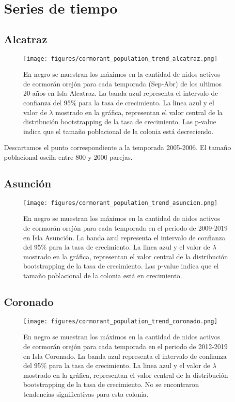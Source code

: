 \documentclass{article} %
\begin{document}
\section*{Series de tiempo}

\subsection*{Alcatraz}

\begin{figure}[H]
\hspace{-2cm}
    \texttt{[image: figures/cormorant\_population\_trend\_alcatraz.png]}
\caption{En negro se muestran los máximos en la cantidad de nidos activos de cormorán orejón para cada temporada (Sep-Abr) de los ultimos 20 años en Isla Alcatraz. La banda azul representa el intervalo de confianza del 95\% para la tasa de crecimiento. La linea azul y el valor de $\lambda$ mostrado en la gráfica, representan el valor central de la distribución bootstrapping de la tasa de crecimiento. Las p-value indica que el tamaño poblacional de la colonia está decreciendo.}
\end{figure}

Descartamos el punto correspondiente a la temporada 2005-2006. El tamaño poblacional oscila entre 800 y 2000 parejas. 

\subsection*{Asunción}

\begin{figure}[H]
\hspace{-2cm}
    \texttt{[image: figures/cormorant\_population\_trend\_asuncion.png]}
\caption{En negro se muestran los máximos en la cantidad de nidos activos de cormorán orejón para cada temporada en el periodo de 2009-2019 en Isla Asunción. La banda azul representa el intervalo de confianza del 95\% para la tasa de crecimiento. La linea azul y el valor de $\lambda$ mostrado en la gráfica, representan el valor central de la distribución bootstrapping de la tasa de crecimiento. Las p-value indica que el tamaño poblacional de la colonia está en crecimiento.}
\end{figure}

\subsection*{Coronado}

\begin{figure}[H]
\hspace{-2cm}
    \texttt{[image: figures/cormorant\_population\_trend\_coronado.png]}
\caption{En negro se muestran los máximos en la cantidad de nidos activos de cormorán orejón para cada temporada en el periodo de 2012-2019 en Isla Coronado. La banda azul representa el intervalo de confianza del 95\% para la tasa de crecimiento. La linea azul y el valor de $\lambda$ mostrado en la gráfica, representan el valor central de la distribución bootstrapping de la tasa de crecimiento. No se encontraron tendencias significativas para esta colonia.}
\end{figure}
\end{document}
